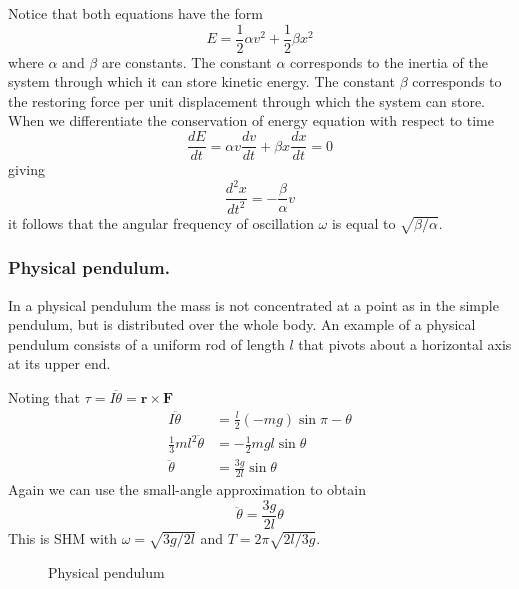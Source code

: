 \documentclass[../../../main.tex]{subfiles}
\begin{document}
Notice that both equations have the form
\begin{equation*}
    E=\frac{1}{2}\alpha v^2+\frac{1}{2}\beta x^2
\end{equation*}
where $\alpha$ and $\beta$ are constants. The constant $\alpha$ corresponds to the inertia of the system through which it can store kinetic energy. The constant $\beta$ corresponds to the restoring force per unit displacement through which the system can store. When we differentiate the conservation of energy equation with respect to time 
\begin{equation*}
    \frac{dE}{dt}=\alpha v\frac{dv}{dt}+\beta x\frac{dx}{dt}=0
\end{equation*}
giving
\begin{equation*}
    \frac{d^2x}{dt^2}=-\frac{\beta}{\alpha}v
\end{equation*}
it follows that the angular frequency of oscillation $\omega$ is equal to $\sqrt{\beta/\alpha}$.

\subsubsection*{Physical pendulum.} In a physical pendulum the mass is not concentrated at a point as in the simple pendulum, but is distributed over the whole body. An example of a physical pendulum consists of a uniform rod of length $l$ that pivots about a horizontal axis at its upper end. 

Noting that $\tau=I\ddot{\theta}=\mathbf{r}\times\mathbf{F}$
\begin{align*}
    I\ddot{\theta}&=\frac{l}{2}(-mg)\sin \pi-\theta\\
    \frac{1}{3}ml^2\ddot{\theta}&=-\frac{1}{2}mgl\sin \theta\\
    \ddot{\theta}&=\frac{3g}{2l}\sin\theta
\end{align*}
Again we can use the small-angle approximation to obtain
\begin{equation*}
    \ddot{\theta}=\frac{3g}{2l}\theta
\end{equation*}
This is SHM with $\omega = \sqrt{3g/2l} $ and $T = 2\pi \sqrt{2l/3g}$.
\begin{figure*}[h]
    \centering
    \caption*{Physical pendulum}
\end{figure*}
\end{document}

